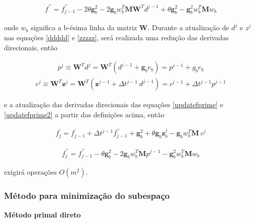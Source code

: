           \begin{eqnarray}
          \label{updatefprime2}
          f^{\prime \prime } = f^{\prime \prime}_{j-1} -2\theta \mathbf{g}_{b}^{2} - 2 \mathbf{g}_{b} w_{b}^{T} \mathbf{M}\mathbf{W}^{T} d^{j-1} + \theta \mathbf{g}_{b}^{2} - \mathbf{g}_{b}^{2} w_{b}^{T} \mathbf{M} w_{b} 
          \end{eqnarray}

           onde $w_{b}$ significa a b-ésima linha da matriz $\mathbf{W}$. Durante a atualização de  $d^{j}$ e $z^{j}$  nas equações  \ref{ddddd} e \ref{zzzzz}, será realizada uma redução das derivadas direcionais, então 
           
           \begin{eqnarray}
            \nonumber
            p^{j} \equiv \mathbf{W}^{T} d^{j} = \mathbf{W}^{T} (d^{j-1} + \mathbf{g}_{b} e_{b}) = p^{j-1} + g_{b}e_{b}
           \end{eqnarray}
           \begin{eqnarray}
            c^{j} \equiv \mathbf{W}^{T} \mathbf{z}^{j} = \mathbf{W}^{T} ( \mathbf{z}^{j-1} + \Delta t^{j-1}~d^{j-1})= c^{j-1}+ \Delta t^{j-1} p^{j-1}
            \label{cccc}
           \end{eqnarray}


          e a atualização das derivadas direcionais das equações \ref{updatefprime} e \ref{updatefprime2} a partir das definições acima, então 
          
         \begin{eqnarray}
          f^{\prime}_{j} = f^{\prime}_{j-1} + \Delta t^{j-1} f^{\prime \prime}_{j-1} + \mathbf{g}^{2}_{b} + \theta \mathbf{g}_{b} \mathbf{z}^{j}_{b} - \mathbf{g}_{b} w_{b}^{T} \mathbf{M}~ c^{j} 
         \end{eqnarray}

          \begin{eqnarray}
           f_{j}^{\prime \prime}=f_{j-1}^{\prime \prime}-\theta \mathbf{g}_{b}^{2}-2 \mathbf{g}_{b} w_{b}^{T} \mathbf{M} p^{j-1}-\mathbf{g}_{b}^{2} w_{b}^{T} \mathbf{M} w_{b}
          \end{eqnarray}

          exigirá operações $O(m^{2})$.
          
          \subsubsection{Método para minimização do subespaço}
          \vspace{0.5cm}
          \begin{center}
           \textbf{Método primal direto}
          \end{center}

